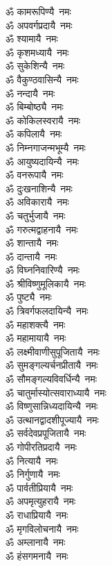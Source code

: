 \begin{multicols}{2}
\begin{flushleft}
ॐ कामरूपिण्यै~नमः\\
ॐ अपवर्गप्रदायै~नमः\\
ॐ श्यामायै~नमः\\
ॐ कृशमध्यायै~नमः\\
ॐ सुकेशिन्यै~नमः\\
ॐ वैकुण्ठवासिन्यै~नमः\\
ॐ नन्दायै~नमः\\
ॐ बिम्बोष्ठ्यै~नमः\\
ॐ कोकिलस्वरायै~नमः\\
ॐ कपिलायै~नमः\hfill{}‌\\
ॐ निम्नगाजन्मभूम्यै~नमः\\
ॐ आयुष्यदायिन्यै~नमः\\
ॐ वनरूपायै~नमः\\
ॐ दुःखनाशिन्यै~नमः\\
ॐ अविकारायै~नमः\\
ॐ चतुर्भुजायै~नमः\\
ॐ गरुत्मद्वाहनायै~नमः\\
ॐ शान्तायै~नमः\\
ॐ दान्तायै~नमः\\
ॐ विघ्ननिवारिण्यै~नमः\hfill{}‌\\
ॐ श्रीविष्णुमूलिकायै~नमः\\
ॐ पुष्ट्यै~नमः\\
ॐ त्रिवर्गफलदायिन्यै~नमः\\
ॐ महाशक्त्यै~नमः\\
ॐ महामायायै~नमः\\
ॐ लक्ष्मीवाणीसुपूजितायै~नमः\\
ॐ सुमङ्गल्यर्चनप्रीतायै~नमः\\
ॐ सौमङ्गल्यविवर्धिन्यै~नमः\\
ॐ चातुर्मास्योत्सवाराध्यायै~नमः\\
ॐ विष्णुसान्निध्यदायिन्यै~नमः\hfill{}‌\\
ॐ उत्थानद्वादशीपूज्यायै~नमः\\
ॐ सर्वदेवप्रपूजितायै~नमः\\
ॐ गोपीरतिप्रदायै~नमः\\
ॐ नित्यायै~नमः\\
ॐ निर्गुणायै~नमः\\
ॐ पार्वतीप्रियायै~नमः\\
ॐ अपमृत्युहरायै~नमः\\
ॐ राधाप्रियायै~नमः\\
ॐ मृगविलोचनायै~नमः\\
ॐ अम्लानायै~नमः\hfill{}‌\\
ॐ हंसगमनायै~नमः\\

\end{flushleft}
\end{multicols}
